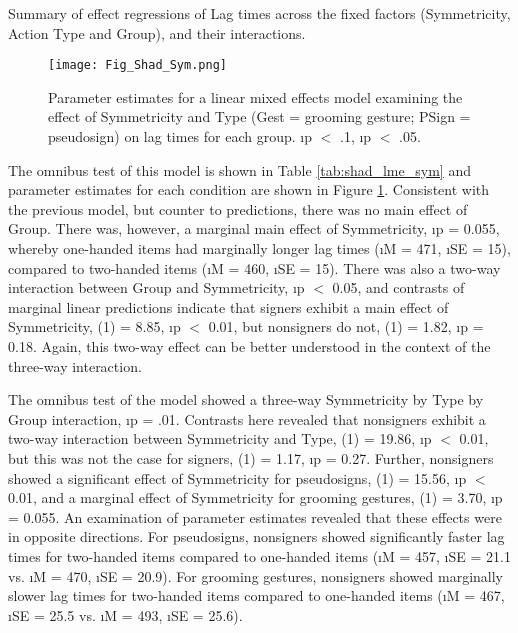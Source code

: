             \begin{table}[!h]\centering \begin{threeparttable} 
                \caption[Shadowing effect of Symmetricity, mixed effect model]{Summary of effect regressions of Lag times across the fixed factors (Symmetricity, Action Type and Group), and their interactions.} \label{tab:shad_lme_sym}
                
            \end{threeparttable}\end{table}
            \begin{figure}[!h] \centering 
                \texttt{[image: Fig\_Shad\_Sym.png]} 
                \caption[Parameter estimates: Shadowing, effect of Symmetricity]{Parameter estimates for a linear mixed effects model examining the effect of Symmetricity and Type (Gest = grooming gesture; PSign = pseudosign)  on lag times for each group. \marS \i{p} $<$ .1, \oneS \i{p} $<$ .05.} \label{fig:shad_sym}
            \end{figure}    
 
 

            The omnibus test of this model is shown in Table \ref{tab:shad_lme_sym} and parameter estimates for each condition are shown in Figure \ref{fig:shad_sym}. Consistent with the previous model, but counter to predictions, there was no main effect of Group. There was, however, a marginal main effect of Symmetricity, \i{p} = 0.055, whereby one-handed items had marginally longer lag times (\i{M} = 471, \i{SE} = 15), compared to two-handed items (\i{M} = 460, \i{SE} = 15). There was also a two-way interaction between Group and Symmetricity, \i{p} $<$ 0.05, and contrasts of marginal linear predictions indicate that signers exhibit a main effect of Symmetricity, \chsq(1) = 8.85, \i{p} $<$ 0.01, but nonsigners do not, \chsq(1) = 1.82, \i{p} = 0.18. Again, this two-way effect can be better understood in the context of the three-way interaction. \par
            The omnibus test of the model showed a three-way Symmetricity by Type by Group interaction, \i{p} = .01. Contrasts here revealed that nonsigners exhibit a two-way interaction between Symmetricity and Type, \chsq(1) = 19.86, \i{p} $<$ 0.01, but this was not the case for signers, \chsq(1) = 1.17, \i{p} = 0.27. Further, nonsigners showed a significant effect of Symmetricity for pseudosigns, \chsq(1) = 15.56, \i{p} $<$ 0.01, and a marginal effect of Symmetricity for grooming gestures, \chsq(1) = 3.70, \i{p} = 0.055. An examination of parameter estimates revealed that these effects were in opposite directions. For pseudosigns, nonsigners showed significantly faster lag times for two-handed items compared to one-handed items (\i{M} = 457, \i{SE} = 21.1 vs. \i{M} = 470, \i{SE} = 20.9). For grooming gestures, nonsigners showed marginally slower lag times for two-handed items compared to one-handed items (\i{M} = 467, \i{SE} = 25.5 vs. \i{M} = 493, \i{SE} = 25.6).             
